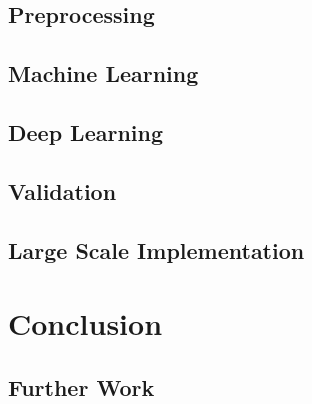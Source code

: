 \documentclass[a4paper, 11pt, twocolumn]{report}
\begin{document}
\subsection{Preprocessing}


\subsection{Machine Learning}



\subsection{Deep Learning}



\subsection{Validation}

\subsection{Large Scale Implementation}





\section{Conclusion}

\subsection{Further Work}


\printbibliography
\end{document}
